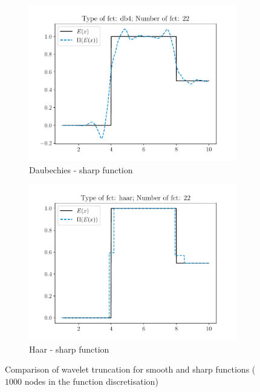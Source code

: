\begin{figure}
  \begin{subfigure}[t]{0.5\linewidth}
    \centering
    \includegraphics[width=\linewidth]{Figures/db4_N_22_sharp.pdf}
    \caption{Daubechies - sharp function}
\end{subfigure} 
  \begin{subfigure}[t]{0.5\linewidth}
    \centering
    \includegraphics[width=\linewidth]{Figures/haar_N_22_sharp.pdf}
    \caption{Haar - sharp function}
\end{subfigure} 
\caption{Comparison of wavelet truncation for smooth and sharp functions ($1000$ nodes in the function discretisation)}
    \label{Wavelet_1D}
\end{figure}

